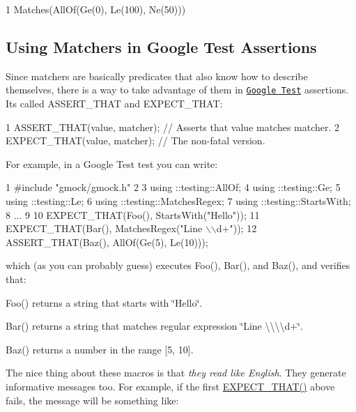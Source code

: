 \begin{DoxyCode}
1 Matches(AllOf(Ge(0), Le(100), Ne(50)))
\end{DoxyCode}


\subsection*{Using Matchers in Google Test Assertions}

Since matchers are basically predicates that also know how to describe themselves, there is a way to take advantage of them in \href{http://code.google.com/p/googletest/}{\tt Google Test} assertions. It\textquotesingle{}s called {\ttfamily A\+S\+S\+E\+R\+T\+\_\+\+T\+H\+AT} and {\ttfamily E\+X\+P\+E\+C\+T\+\_\+\+T\+H\+AT}\+:


\begin{DoxyCode}
1 ASSERT\_THAT(value, matcher);  // Asserts that value matches matcher.
2 EXPECT\_THAT(value, matcher);  // The non-fatal version.
\end{DoxyCode}


For example, in a Google Test test you can write\+:


\begin{DoxyCode}
1 #include "gmock/gmock.h"
2 
3 using ::testing::AllOf;
4 using ::testing::Ge;
5 using ::testing::Le;
6 using ::testing::MatchesRegex;
7 using ::testing::StartsWith;
8 ...
9 
10   EXPECT\_THAT(Foo(), StartsWith("Hello"));
11   EXPECT\_THAT(Bar(), MatchesRegex("Line \(\backslash\)\(\backslash\)d+"));
12   ASSERT\_THAT(Baz(), AllOf(Ge(5), Le(10)));
\end{DoxyCode}


which (as you can probably guess) executes {\ttfamily Foo()}, {\ttfamily Bar()}, and {\ttfamily Baz()}, and verifies that\+:


\begin{DoxyItemize}
\item {\ttfamily Foo()} returns a string that starts with {\ttfamily \char`\"{}\+Hello\char`\"{}}.
\item {\ttfamily Bar()} returns a string that matches regular expression {\ttfamily \char`\"{}\+Line \textbackslash{}\textbackslash{}\textbackslash{}\textbackslash{}d+\char`\"{}}.
\item {\ttfamily Baz()} returns a number in the range \mbox{[}5, 10\mbox{]}.
\end{DoxyItemize}

The nice thing about these macros is that {\itshape they read like English}. They generate informative messages too. For example, if the first {\ttfamily \hyperlink{gmock-matchers_8h_ac31e206123aa702e1152bb2735b31409}{E\+X\+P\+E\+C\+T\+\_\+\+T\+H\+A\+T()}} above fails, the message will be something like\+:


